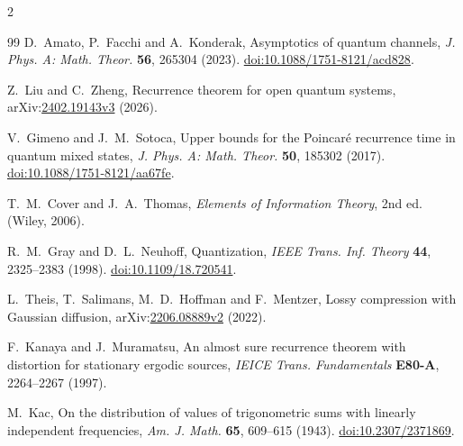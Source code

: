 \documentclass[10pt]{article}
\theoremstyle{definition}
\begin{document}
\begin{multicols}{2}
\begin{thebibliography}{99}
D.~Amato, P.~Facchi and A.~Konderak,
Asymptotics of quantum channels,
\emph{J. Phys. A: Math. Theor.} \textbf{56}, 265304 (2023).
\href{https://doi.org/10.1088/1751-8121/acd828}
{doi:10.1088/1751-8121/acd828}.

Z.~Liu and C.~Zheng,
Recurrence theorem for open quantum systems,
arXiv:\href{https://arxiv.org/abs/2402.19143}{2402.19143v3} (2026).

V.~Gimeno and J.~M.~Sotoca,
Upper bounds for the Poincar\'e recurrence time in quantum mixed states,
\emph{J. Phys. A: Math. Theor.} \textbf{50}, 185302 (2017).
\href{https://doi.org/10.1088/1751-8121/aa67fe}
{doi:10.1088/1751-8121/aa67fe}.

T.~M.~Cover and J.~A.~Thomas,
\emph{Elements of Information Theory}, 2nd ed. (Wiley, 2006).

R.~M.~Gray and D.~L.~Neuhoff,
Quantization,
\emph{IEEE Trans. Inf. Theory} \textbf{44}, 2325--2383 (1998).
\href{https://doi.org/10.1109/18.720541}{doi:10.1109/18.720541}.

L.~Theis, T.~Salimans, M.~D.~Hoffman and F.~Mentzer,
Lossy compression with Gaussian diffusion,
arXiv:\href{https://arxiv.org/abs/2206.08889}{2206.08889v2} (2022).

F.~Kanaya and J.~Muramatsu,
An almost sure recurrence theorem with distortion for stationary ergodic
sources,
\emph{IEICE Trans. Fundamentals} \textbf{E80-A}, 2264--2267 (1997).

M.~Kac,
On the distribution of values of trigonometric sums with linearly independent
frequencies,
\emph{Am. J. Math.} \textbf{65}, 609--615 (1943).
\href{https://doi.org/10.2307/2371869}{doi:10.2307/2371869}.

\end{thebibliography}
\end{multicols}
\end{document}
